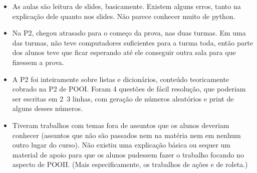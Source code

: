 \documentclass{ata-calico}
\begin{document}
\begin{itemize}
    \item As aulas são leitura de slides, basicamente. Existem alguns erros, tanto na explicação dele quanto nos slides. Não parece conhecer muito de python.
    \item Na P2, chegou atrasado para o começo da prova, nas duas turmas. Em uma das turmas, não teve computadores suficientes para a turma toda, então parte dos alunos teve que ficar esperando até ele conseguir outra sala para que fizessem a prova.
    \item A P2 foi inteiramente sobre listas e dicionários, conteúdo teoricamente cobrado na P2 de POOI. Foram 4 questões de fácil resolução, que poderiam ser escritas em 2~3 linhas, com geração de números aleatórios e print de alguns desses números.
    \item Tiveram trabalhos com temas fora de assuntos que os alunos deveriam conhecer (assuntos que não são passados nem na matéria nem em nenhum outro lugar do curso). Não existiu uma explicação básica ou sequer um material de apoio para que os alunos pudessem fazer o trabalho focando no aspecto de POOII. (Mais especificamente, os trabalhos de ações e de roleta.)
\end{itemize}
\end{document}
